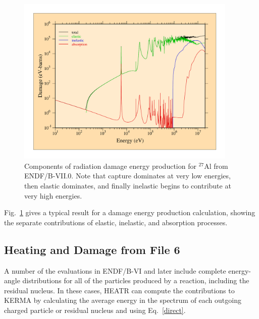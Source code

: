 \begin{figure}[tp]\centering
\includegraphics[keepaspectratio,height=3.2in, angle=0]{figs/heatr3ack}
\caption[Components of radiation damage energy production for $^{27}$Al]
{Components of radiation damage energy production
for $^{27}$Al from ENDF/B-VII.0.  Note that capture dominates at
very low energies, then elastic dominates, and finally inelastic
begins to contribute at very high energies.}
\label{f3}
\end{figure}

Fig.~\ref{f3} gives a typical result for a damage energy
production calculation, showing the separate contributions of
elastic, inelastic, and absorption processes.

\subsection{Heating and Damage from File 6}
\label{ssHEATR_file6}

A number of the evaluations in ENDF/B-VI and later include complete
energy-angle distributions for all of the particles produced
by a reaction, including the residual nucleus.
In these cases, HEATR can compute the contributions to KERMA by
calculating the average energy in the spectrum of each outgoing
charged particle or residual nucleus and using Eq.~\ref{direct}.

